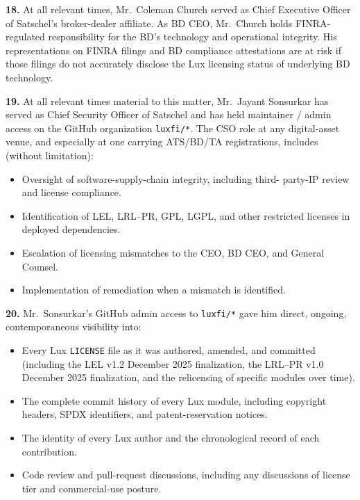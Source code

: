 \documentclass[11pt,letterpaper]{article}
\begin{document}
\textbf{18.} At all relevant times, Mr.\ Coleman Church served as
Chief Executive Officer of Satschel's broker-dealer affiliate. As BD
CEO, Mr.\ Church holds FINRA-regulated responsibility for the BD's
technology and operational integrity. His representations on FINRA
filings and BD compliance attestations are at risk if those filings
do not accurately disclose the Lux licensing status of underlying
BD technology.

\textbf{19.} At all relevant times material to this matter, Mr.\
Jayant Sonsurkar has served as Chief Security Officer of Satschel
and has held maintainer / admin access on the GitHub organization
\texttt{luxfi/*}. The CSO role at any digital-asset venue, and
especially at one carrying ATS/BD/TA registrations, includes (without
limitation):

\begin{itemize}[leftmargin=2em,itemsep=0.1em]
\item Oversight of software-supply-chain integrity, including third-
party-IP review and license compliance.
\item Identification of LEL, LRL--PR, GPL, LGPL, and other
restricted licenses in deployed dependencies.
\item Escalation of licensing mismatches to the CEO, BD CEO, and
General Counsel.
\item Implementation of remediation when a mismatch is identified.
\end{itemize}

\textbf{20.} Mr.\ Sonsurkar's GitHub admin access to \texttt{luxfi/*}
gave him direct, ongoing, contemporaneous visibility into:

\begin{itemize}[leftmargin=2em,itemsep=0.1em]
\item Every Lux \texttt{LICENSE} file as it was authored, amended,
and committed (including the LEL v1.2 December 2025 finalization, the
LRL--PR v1.0 December 2025 finalization, and the relicensing of
specific modules over time).
\item The complete commit history of every Lux module, including
copyright headers, SPDX identifiers, and patent-reservation notices.
\item The identity of every Lux author and the chronological record
of each contribution.
\item Code review and pull-request discussions, including any
discussions of license tier and commercial-use posture.
\end{itemize}
\end{document}
